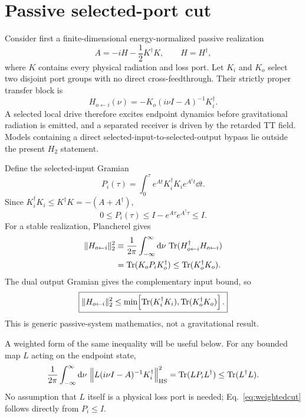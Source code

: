 \section{Passive selected-port cut}
\label{sec:passive}

Consider first a finite-dimensional energy-normalized passive realization
\begin{equation}
A=-iH-\frac12K^\dagger K,
\qquad H=H^\dagger,
\label{eq:Apassive}
\end{equation}
where $K$ contains every physical radiation and loss port. Let $K_i$ and $K_o$ select two disjoint port groups with no direct cross-feedthrough. Their strictly proper transfer block is
\begin{equation}
H_{o\leftarrow i}(\nu)
=-K_o(i\nu I-A)^{-1}K_i^\dagger .
\label{eq:crossH}
\end{equation}
A selected local drive therefore excites endpoint dynamics before gravitational radiation is emitted, and a separated receiver is driven by the retarded TT field. Models containing a direct selected-input-to-selected-output bypass lie outside the present $H_2$ statement.

Define the selected-input Gramian
\begin{equation}
P_i(\tau)=\int_0^\tau
e^{At}K_i^\dagger K_i e^{A^\dagger t}\dd t .
\end{equation}
Since $K_i^\dagger K_i\le K^\dagger K=-(A+A^\dagger)$,
\begin{equation}
\boxed{
0\le P_i(\tau)
\le I-e^{A\tau}e^{A^\dagger\tau}
\le I .
}
\label{eq:PiBound}
\end{equation}
For a stable realization, Plancherel gives
\begin{align}
\|H_{o\leftarrow i}\|_2^2
&\equiv \frac{1}{2\pi}\int_{-\infty}^{\infty}\mathrm d\nu\,
\operatorname{Tr}(H_{o\leftarrow i}^\dagger H_{o\leftarrow i})\\
&=\operatorname{Tr}(K_oP_iK_o^\dagger)
\le \operatorname{Tr}(K_o^\dagger K_o).
\end{align}
The dual output Gramian gives the complementary input bound, so
\begin{equation}
\boxed{
\|H_{o\leftarrow i}\|_2^2
\le
\min\!\left[
\operatorname{Tr}(K_i^\dagger K_i),
\operatorname{Tr}(K_o^\dagger K_o)
\right].
}
\label{eq:h2cut}
\end{equation}
This is generic passive-system mathematics, not a gravitational result.

A weighted form of the same inequality will be useful below. For any bounded map $L$ acting on the endpoint state,
\begin{equation}
\frac{1}{2\pi}\int_{-\infty}^{\infty}\mathrm d\nu\,
\left\|L(i\nu I-A)^{-1}K_i^\dagger\right\|_{\mathrm{HS}}^2
=\operatorname{Tr}(LP_iL^\dagger)
\le\operatorname{Tr}(L^\dagger L).
\label{eq:weightedcut}
\end{equation}
No assumption that $L$ itself is a physical loss port is needed; Eq.~\eqref{eq:weightedcut} follows directly from $P_i\le I$.

